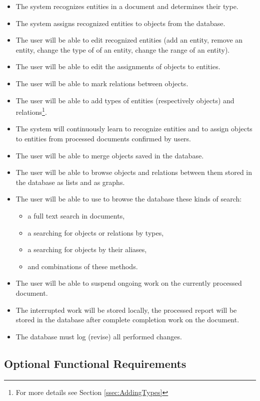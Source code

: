 \begin{itemize}
	\item The system recognizes entities in a document and determines their type.
	\item The system assigns recognized entities to objects from the database.
	\item The user will be able to edit recognized entities (add an entity,
	remove an entity, change the type of of an entity, change the range of an
	entity).
	\item The user will be able to edit the assignments of objects to entities.
	\item The user will be able to mark relations between objects.
	\item The user will be able to add types of entities (respectively objects)
	and relations\footnote{For more details see Section \ref{ssec:AddingTypes}}.
	\item The system will continuously learn to recognize entities and to assign
	objects to entities from processed documents confirmed by users.
	\item The user will be able to merge objects saved in the database.
	\item The user will be able to browse objects and relations between them
	stored in the database as lists and as graphs.
	\item The user will be able to use to browse the database these kinds of 
	search:
	\begin{itemize}
		\item a full text search in documents,
		\item a searching for objects or relations by types,
		\item a searching for objects by their aliases,
		\item and combinations of these methods.
	\end{itemize}
	\item The user will be able to suspend ongoing work on the currently
	processed document.
	\item The interrupted work will be stored locally, the processed report will
	be stored in the database after complete  completion work on the document.
	\item The database must log (revise) all performed changes.
\end{itemize}

\subsection{Optional Functional Requirements}

